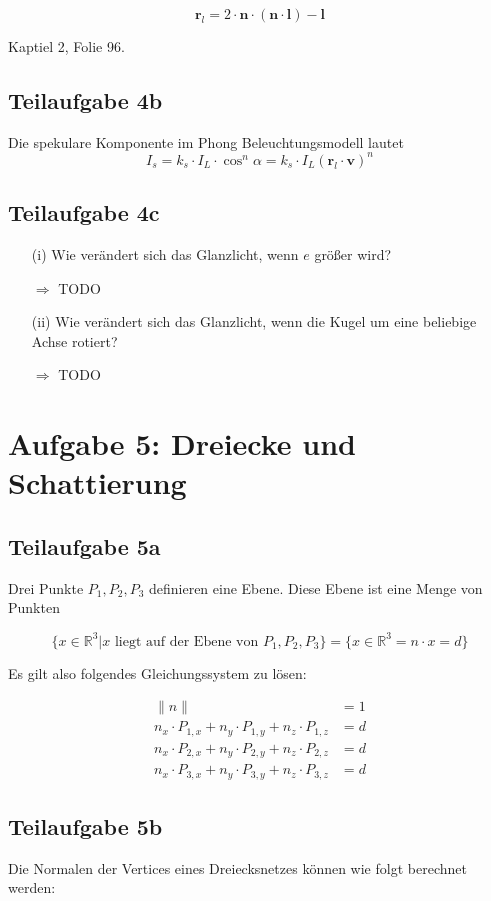 \documentclass[a4paper]{scrartcl}
\begin{document}
\[\mathbf{r}_l = 2 \cdot \mathbf{n} \cdot (\mathbf{n} \cdot \mathbf{l}) - \mathbf{l}\]

Kaptiel 2, Folie 96.


\subsection*{Teilaufgabe 4b}
Die spekulare Komponente im Phong Beleuchtungsmodell lautet
\[I_s = k_s \cdot I_L \cdot \cos^n \alpha = k_s \cdot I_L (\mathbf{r}_l \cdot \mathbf{v})^n\]

\subsection*{Teilaufgabe 4c}
\begin{enumerate}
    \item[(i)] Wie verändert sich das Glanzlicht, wenn $e$ größer wird?
    \item[$\Rightarrow$] TODO
    \item[(ii)] Wie verändert sich das Glanzlicht, wenn die Kugel um eine beliebige Achse rotiert?
    \item[$\Rightarrow$] TODO
\end{enumerate}


\section*{Aufgabe 5: Dreiecke und Schattierung}
\subsection*{Teilaufgabe 5a}
Drei Punkte $P_1, P_2, P_3$ definieren eine Ebene. Diese Ebene ist eine Menge
von Punkten

\[\{x \in \mathbb{R}^3 | x \text{ liegt auf der Ebene von } P_1, P_2, P_3\} = \{x \in \mathbb{R}^3 = n \cdot x = d\}\]

Es gilt also folgendes Gleichungssystem zu lösen:

\begin{align}
    \|n\| &= 1\\
    n_x \cdot P_{1, x} + n_y \cdot P_{1, y} + n_z \cdot P_{1, z} &= d\\
    n_x \cdot P_{2, x} + n_y \cdot P_{2, y} + n_z \cdot P_{2, z} &= d\\
    n_x \cdot P_{3, x} + n_y \cdot P_{3, y} + n_z \cdot P_{3, z} &= d
\end{align}

\subsection*{Teilaufgabe 5b}
Die Normalen der Vertices eines Dreiecksnetzes können wie folgt berechnet werden:
\end{document}
